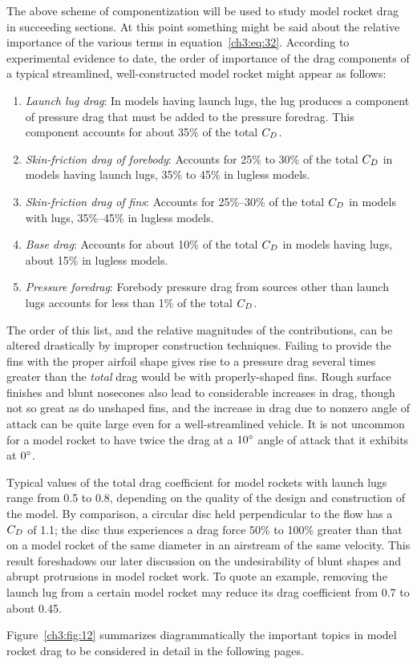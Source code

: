 The above scheme of componentization will be used to study model rocket drag in
succeeding sections. At this point something might be said about the relative
importance of the various terms in equation~\eqref{ch3:eq:32}. According to
experimental evidence to date, the order of importance of the drag components of a
typical streamlined, well-constructed model rocket might appear as follows:
\begin{enumerate}[label=\arabic*),leftmargin=4.5em,labelsep=0.8em]
  \item \emph{Launch lug drag}: In models having launch lugs, the lug produces a
  component of pressure drag that must be added to the pressure foredrag. This
  component accounts for about 35\% of the total $C_{D}$.
  \item \emph{Skin-friction drag of forebody}: Accounts for 25\% to 30\% of the
  total $C_{D}$ in models having launch lugs, 35\% to 45\% in lugless models.
  \item \emph{Skin-friction drag of fins}: Accounts for 25\%--30\% of the total
  $C_{D}$ in models with lugs, 35\%--45\% in lugless models.
  \item \emph{Base drag}: Accounts for about 10\% of the total $C_{D}$ in models having
  lugs, about 15\% in lugless models.
  \item \emph{Pressure foredrag}: Forebody pressure drag from sources other than
  launch lugs accounts for less than 1\% of the total $C_{D}$.
\end{enumerate}
The order of this list, and the relative magnitudes of the contributions, can be
altered drastically by improper construction techniques. Failing to provide the
fins with the proper airfoil shape gives rise to a pressure drag several times
greater than the \emph{total} drag would be with properly-shaped fins. Rough surface
finishes and blunt nosecones also lead to considerable increases in drag, though not
so great as do unshaped fins, and the increase in drag due to nonzero angle of
attack can be quite large even for a well-streamlined vehicle. It is not uncommon
for a model rocket to have twice the drag at a $10^{\circ}$ angle of attack that it
exhibits at $0^{\circ}$.

Typical values of the total drag coefficient for model rockets with launch lugs
range from 0.5 to 0.8, depending on the quality of the design and construction of
the model. By comparison, a circular disc held perpendicular to the flow has a
$C_{D}$ of 1.1; the disc thus experiences a drag force 50\% to 100\% greater than that
on a model rocket of the same diameter in an airstream of the same velocity. This
result foreshadows our later discussion on the undesirability of blunt shapes and
abrupt protrusions in model rocket work. To quote an example, removing the launch
lug from a certain model rocket may reduce its drag coefficient from 0.7 to about
0.45.

Figure~\ref{ch3:fig:12} summarizes diagrammatically the important topics in model
rocket drag to be considered in detail in the following pages.
